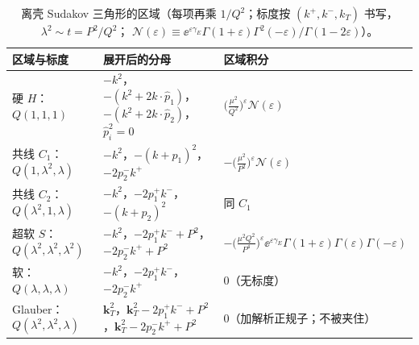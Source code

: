 \begin{table}[htbp]
\centering\small
\caption{离壳 Sudakov 三角形的区域（每项再乘 $1/Q^2$；标度按 $(k^+,k^-,k_T)$ 书写，$\lambda^2\sim t=P^2/Q^2$；
$\mathcal N(\varepsilon)\equiv\ee^{\varepsilon\gamma_E}\Gamma(1+\varepsilon)\Gamma^2(-\varepsilon)/\Gamma(1-2\varepsilon)$）。}\label{tab:sudakov-regions}
\renewcommand{\arraystretch}{1.3}
\begin{tabularx}{\textwidth}{@{}>{\raggedright\arraybackslash}p{3.1cm}>{\raggedright\arraybackslash}X>{\raggedright\arraybackslash}p{4.5cm}@{}}
\toprule
区域与标度 & 展开后的分母 & 区域积分\\
\midrule
硬 $H$：$Q(1,1,1)$ & $-k^2$，$-(k^2+2k\cdot\hat p_1)$，$-(k^2+2k\cdot\hat p_2)$，$\hat p_i^2=0$ & $\big(\tfrac{\mu^2}{Q^2}\big)^{\varepsilon}\mathcal N(\varepsilon)$\\
共线 $C_1$：$Q(1,\lambda^2,\lambda)$ & $-k^2$，$-(k+p_1)^2$，$-2p_2^-k^+$ & $-\big(\tfrac{\mu^2}{P^2}\big)^{\varepsilon}\mathcal N(\varepsilon)$\\
共线 $C_2$：$Q(\lambda^2,1,\lambda)$ & $-k^2$，$-2p_1^+k^-$，$-(k+p_2)^2$ & 同 $C_1$\\
超软 $S$：$Q(\lambda^2,\lambda^2,\lambda^2)$ & $-k^2$，$-2p_1^+k^-+P^2$，$-2p_2^-k^++P^2$ &
$-\big(\tfrac{\mu^2Q^2}{P^4}\big)^{\varepsilon}\ee^{\varepsilon\gamma_E}\Gamma(1+\varepsilon)\Gamma(\varepsilon)\Gamma(-\varepsilon)$\\
软：$Q(\lambda,\lambda,\lambda)$ & $-k^2$，$-2p_1^+k^-$，$-2p_2^-k^+$ & $0$（无标度）\\
Glauber：$Q(\lambda^2,\lambda^2,\lambda)$ & $\mathbf k_T^2$，$\mathbf k_T^2-2p_1^+k^-+P^2$，$\mathbf k_T^2-2p_2^-k^++P^2$ & $0$（加解析正规子；不被夹住）\\
\bottomrule
\end{tabularx}
\end{table}

